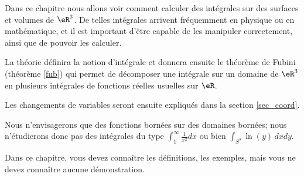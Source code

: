 Dans ce chapitre nous allons voir comment calculer des intégrales sur des surfaces et volumes de $\eR^3$. De telles intégrales arrivent fréquemment en physique ou en mathématique, et il est important d'être capable de les manipuler correctement, ainsi que de pouvoir les calculer. 

La théorie définira la notion d'intégrale et donnera ensuite le théorème de Fubini (théorème \ref{fub}) qui permet de décomposer une intégrale sur un domaine de $\eR^3$ en plusieurs intégrales de fonctions réelles usuelles sur $\eR$.

Les changements de variables seront ensuite expliqués dans la section \ref{sec_coord}.

Nous n'envisagerons que des fonctions bornées sur des domaines bornées; nous n'étudierons donc pas des intégrales du type $\int_1^{\infty}\frac{1}{ x^2 }dx$ ou bien $\int_{S^2}\ln(y)\,dxdy$.

Dans ce chapitre, vous devez connaître les définitions, les exemples, mais vous ne devez connaître aucune démonstration.
